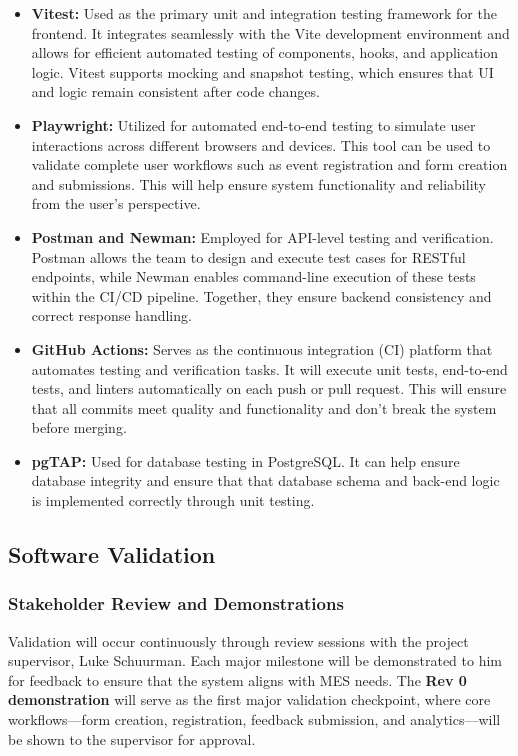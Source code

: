 \documentclass[12pt, titlepage]{article}
\begin{document}
\begin{itemize}
    \item \textbf{Vitest:} Used as the primary unit and integration testing framework for the frontend. It integrates seamlessly with the Vite development environment and allows for efficient automated testing of components, hooks, and application logic. Vitest supports mocking and snapshot testing, which ensures that UI and logic remain consistent after code changes.

    \item \textbf{Playwright:} Utilized for automated end-to-end testing to simulate user interactions across different browsers and devices. This tool can be used to validate complete user workflows such as event registration and form creation and submissions. This will help ensure system functionality and reliability from the user's perspective.

    \item \textbf{Postman and Newman:} Employed for API-level testing and verification. Postman allows the team to design and execute test cases for RESTful endpoints, while Newman enables command-line execution of these tests within the CI/CD pipeline. Together, they ensure backend consistency and correct response handling.

    \item \textbf{GitHub Actions:} Serves as the continuous integration (CI) platform that automates testing and verification tasks. It will execute unit tests, end-to-end tests, and linters automatically on each push or pull request. This will ensure that all commits meet quality and functionality and don't break the system before merging.

    \item \textbf{pgTAP:} Used for database testing in PostgreSQL. It can help ensure database integrity and ensure that that database schema and back-end logic is implemented correctly through unit testing.
\end{itemize}

\subsection{Software Validation}

\subsubsection*{Stakeholder Review and Demonstrations}
Validation will occur continuously through review sessions with the project supervisor, Luke Schuurman. Each major milestone will be demonstrated to him for feedback to ensure that the system aligns with MES needs. The \textbf{Rev 0 demonstration} will serve as the first major validation checkpoint, where core workflows—form creation, registration, feedback submission, and analytics—will be shown to the supervisor for approval.
\end{document}
